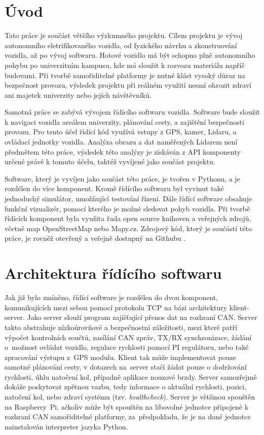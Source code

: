 \documentclass[czech, bachelor]{diploma}
\begin{document}
\MakeTitlePages

\chapter{Úvod} \label{sec:Introduction}
Tato práce je součást většího výzkumného projektu. Cílem projektu je vývoj autonomního eletrifikovaného vozidla,
od fyzického návrhu a zkonstruování vozidla, až po vývoj softwaru. Hotové vozidlo má být schopno plně autonomního pohybu
po univerzitním kampusu, kde má sloužit k rozvozu materiálu napříč budovami. Při tvorbě samořiditelné platformy je nutné
klást vysoký důraz na bezpečnost provozu, výsledek projektu při reálném využití nesmí ohrozit zdraví ani majetek
univerzity nebo jejích návštěvníků.

Samotná práce se zabývá vývojem řídícího softwaru vozidla. Software bude sloužit k navigaci vozidla areálem univerzity,
plánování cesty, a zajištění bezpečnosti provozu. Pro tento účel řídící kód využívá vstupy z GPS, kamer, Lidaru,
a ovládací jednotky vozidla. Analýza obrazu a dat naměřených Lidarem není předmětem této práce, výsledek této analýzy
je získáván z API komponenty určené právě k tomuto účelu, taktéž vyvíjené jako součást projektu.

Software, který je vyvíjen jako součást této práce, je tvořen v Pythonu, a je rozdělen do více komponent. Kromě řídícího
softwaru byl vyvinut také jednoduchý simulátor, umožňující testování řízení. Dále řídící software obsahuje funkční
vizualizér, pomocí kterého je možné sledovat pohyb vozidla. Při tvorbě řídících komponent byla využita řada open source
knihoven a veřejných zdrojů, včetně map OpenStreetMap nebo Mapy.cz. Zdrojový kód, který je součástí této práce, je
rovněž otevřený a veřejně dostupný na Githubu \cite{car-client-source, car-webapp-source, car-map-downloader-source,
car-can-source, car-simulator-source, geologger-source}.

\chapter{Architektura řídícího softwaru} \label{software-architecture}
Jak již bylo zmíněno, řídící software je rozdělen do dvou komponent, komunikujících mezi sebou pomocí protokolu TCP na bázi
architektury klient-server. Jako server slouží program zajišťující přenos dat na rozhraní CAN. Server takto abstrahuje
nízkoúrovňové a bezpečnostní záležitosti, mezi které patří výpočet kontrolních součtů, zasílání CAN zpráv, TX/RX synchronizace,
žádání o~možnost ovládat vozidlo, regulace rychlosti pomocí PI regulátoru, nebo také zpracování výstupu z~GPS modulu. Klient tak
může implementovat pouze samotné plánování cesty, v dotazech na~server stačí žádat pouze o dodržování rychlosti, úhlu natočení
kol, případně aplikace nouzové brzdy. Server samozřejmě dokáže poskytovat zpětnou vazbu, tedy informace o aktuální rychlosti,
pozici, natočení kol, nebo zdraví systému (tzv. \emph{healthcheck}). Server je většinou spouštěn na Raspberry~Pi, ačkoliv může
být spouštěn na libovolné jednotce připojené k rozhraní CAN samořiditelné platformy, za~předpokladu, že je na dané jednotce
nainstalován interpreter jazyka Python.
\end{document}
